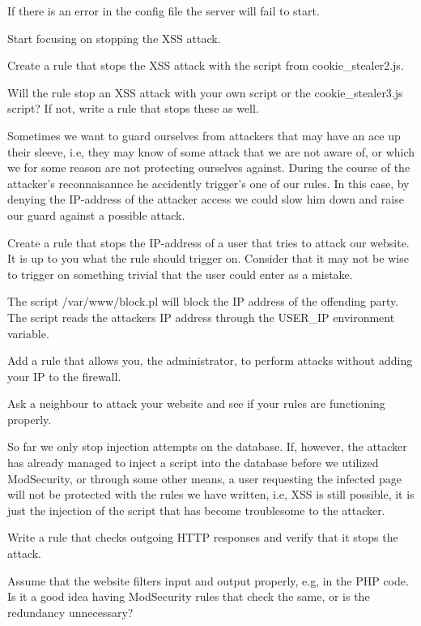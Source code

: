 \documentclass[EITN41]{../tex/cryptosecuritylab}
\begin{document}
If there is an error in the config file the server will fail to start.

Start focusing on stopping the XSS attack.

\bprob
\item Create a rule that stops the XSS attack with the script from cookie\_stealer2.js.
\item Will the rule stop an XSS attack with your own script or the cookie\_stealer3.js script? If not, write a rule that stops these as well.
\eprob

Sometimes we want to guard ourselves from attackers that may have an ace up their sleeve, i.e, they may know of some attack that we are not aware of, or which we for some reason are not protecting ourselves against. During the course of the attacker's reconnaisannce he accidently trigger's one of our rules. In this case, by denying the IP-address of the attacker access we could slow him down and raise our guard against a possible attack.

\bprob
\item Create a rule that stops the IP-address of a user that tries to attack our website. It is up to you what the rule should trigger on. Consider that it may not be wise to trigger on something trivial that the user could enter as a mistake.
\item The script /var/www/block.pl will block the IP address of the offending party. The script reads the attackers IP address through the USER\_IP environment variable.
\item Add a rule that allows you, the administrator, to perform attacks without adding your IP to the firewall.
\item Ask a neighbour to attack your website and see if your rules are functioning properly.
\eprob

So far we only stop injection attempts on the database. If, however, the attacker has already managed to inject a script into the database before we utilized ModSecurity, or through some other means, a user requesting the infected page will not be protected with the rules we have written, i.e, XSS is still possible, it is just the injection of the script that has become troublesome to the attacker.

\bprob
\item Write a rule that checks outgoing HTTP responses and verify that it stops the attack.
\item Assume that the website filters input and output properly, e.g, in the PHP code. Is it a good idea having ModSecurity rules that check the same, or is the redundancy unnecessary?
\eprob
\end{document}
